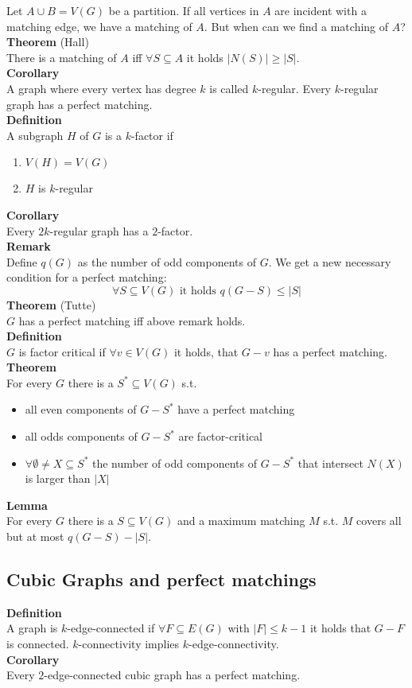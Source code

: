 \documentclass[a4paper, 12pt]{article}
\begin{document}
	Let $A\cup B = V(G)$ be a partition. If all vertices in $A$ are incident with a matching edge, we have a matching of $A$. But when can we find a matching of $A$? \\
	\textbf{Theorem} (Hall)\\
	There is a matching of $A$ iff $\forall S \subseteq A$ it holds $\left|N(S)\right| \geq \left|S\right|$.\\
	\textbf{Corollary}\\
	A graph where every vertex has degree $k$ is called $k$-regular. Every $k$-regular graph has a perfect matching.\\
	\textbf{Definition}\\
	A subgraph $H$ of $G$ is a $k$-factor if \begin{enumerate}
		\item $V(H) = V(G)$
		\item $H$ is $k$-regular 
	\end{enumerate} 
	\textbf{Corollary}\\
	Every $2k$-regular graph has a $2$-factor.\\
	\textbf{Remark}\\
	Define $q(G)$ as the number of odd components of $G$. We get a new necessary condition for a perfect matching: \[\forall S \subseteq V(G) \text{ it holds } q(G-S) \leq \left|S\right|\]
	\textbf{Theorem} (Tutte)\\
	$G$ has a perfect matching iff above remark holds.\\
	\textbf{Definition}\\
	$G$ is factor critical if $\forall v \in V(G)$ it holds, that $G-v$ has a perfect matching.\\
	\textbf{Theorem}\\
	For every $G$ there is a $S^* \subseteq V(G)$ s.t. \begin{itemize}
		\item all even components of $G-S^*$ have a perfect matching
		\item all odds components of $G-S^*$ are factor-critical
		\item $\forall \emptyset \neq X \subseteq S^*$ the number of odd components of $G-S^*$ that intersect $N(X)$ is larger than $\left|X\right|$
	\end{itemize}
	\textbf{Lemma}\\
	For every $G$ there is a $S \subseteq V(G)$ and a maximum matching $M$ s.t. $M$ covers all but at most $q(G-S) - \left|S\right|$.
	\subsection{Cubic Graphs and perfect matchings}
	\textbf{Definition}\\
	A graph is $k$-edge-connected if $\forall F \subseteq E(G)$ with $\left|F\right| \leq k-1$ it holds that $G-F$ is connected. $k$-connectivity implies $k$-edge-connectivity.\\
	\textbf{Corollary}\\
	Every $2$-edge-connected cubic graph has a perfect matching.
\end{document}
